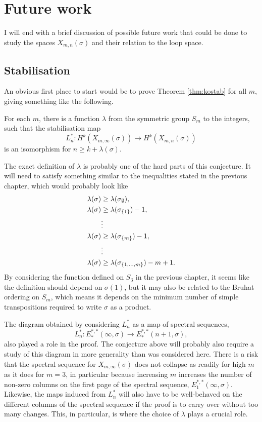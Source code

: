 
\chapter{Future work}

I will end with a brief discussion of possible future work that could
be done to study the spaces $X_{m,n}(\sigma)$ and their relation to
the loop space.

\section{Stabilisation}

An obvious first place to start would be to prove Theorem
\ref{thm:kostab} for all $m$, giving something like the following.

\begin{conjecture}
  For each $m$, there is a function $\lambda$ from the symmetric
  group $S_m$ to the integers, such that the stabilisation map
  \[ L_n^* : H^k(X_{m,\infty}(\sigma)) \to H^k(X_{m,n}(\sigma)) \]
  is an isomorphism for $n \geq k + \lambda(\sigma)$.
\end{conjecture}

The exact definition of $\lambda$ is probably one of the hard parts of
this conjecture. It will need to satisfy something similar to the
inequalities stated in the previous chapter, which would probably look
like
\begin{align*}
  \lambda(\sigma) &\geq \lambda(\sigma_{\emptyset}), \\
  \lambda(\sigma) &\geq \lambda(\sigma_{\left\{ 1 \right\}}) - 1,\\
  &\vdots \\
  \lambda(\sigma) &\geq \lambda(\sigma_{\left\{ m \right\}}) - 1,\\
  &\vdots \\
  \lambda(\sigma) &\geq \lambda(\sigma_{\left\{ 1,\dots,m \right\}}) - m + 1.
\end{align*} 
By considering the function defined on $S_3$ in the previous chapter,
it seems like the definition should depend on $\sigma(1)$, but it may
also be related to the Bruhat ordering on $S_m$, which means it
depends on the minimum number of simple transpositions required to
write $\sigma$ as a product.

The diagram obtained by considering $L_n^*$ as a map of spectral
sequences,
\[ L_n^* : E_*^{*,*}(\infty,\sigma) \to E_*^{*,*}(n+1,\sigma), \]
also played a role in the proof. The conjecture above will probably
also require a study of this diagram in more generality than was
considered here. There is a risk that the spectral sequence for
$X_{m,\infty}(\sigma)$ does not collapse as readily for high $m$ as it
does for $m=3$, in particular because increasing $m$ increases the
number of non-zero columns on the first page of the spectral sequence,
$E_1^{*,*}(\infty,\sigma)$. Likewise, the maps induced from $L_n^*$
will also have to be well-behaved on the different columns of the
spectral sequence if the proof is to carry over without too many
changes. This, in particular, is where the choice of $\lambda$ plays
a crucial role.

